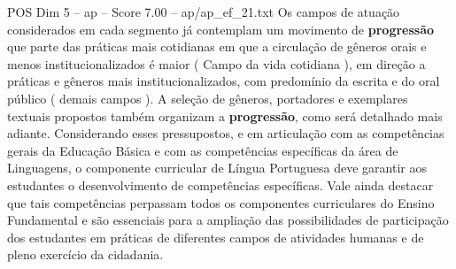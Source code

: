 \begin{textsample}{POS Dim 5 – ap – Score 7.00 – ap/ap\_ef\_21.txt}
Os campos de atuação considerados em cada segmento já contemplam um movimento de \textbf{progressão} que parte das práticas mais cotidianas em que a circulação de gêneros orais e menos institucionalizados é maior ( Campo da vida cotidiana ), em direção a práticas e gêneros mais institucionalizados, com predomínio da escrita e do oral público ( demais campos ).
A seleção de gêneros, portadores e exemplares textuais propostos também organizam a \textbf{progressão}, como será detalhado mais adiante.
Considerando esses pressupostos, e em articulação com as competências gerais da Educação Básica e com as competências específicas da área de Linguagens, o componente curricular de Língua Portuguesa deve garantir aos estudantes o desenvolvimento de competências específicas.
Vale ainda destacar que tais competências perpassam todos os componentes curriculares do Ensino Fundamental e são essenciais para a ampliação das possibilidades de participação dos estudantes em práticas de diferentes campos de atividades humanas e de pleno exercício da cidadania.

\end{textsample}

